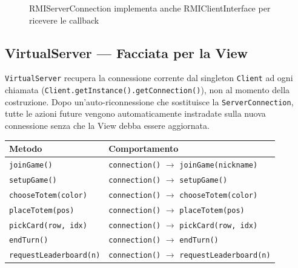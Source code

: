 \documentclass[a4paper,12pt]{article}
\newcommand{\code}[1]{\texttt{#1}}
\begin{document}
\begin{figure}[H]
\centering
{}
\caption{RMIServerConnection implementa anche RMIClientInterface per ricevere le callback}
\end{figure}

\subsection{VirtualServer --- Facciata per la View}

\code{VirtualServer} recupera la connessione corrente dal singleton \code{Client}
ad ogni chiamata (\code{Client.getInstance().getConnection()}), non al momento
della costruzione. Dopo un'auto-riconnessione che sostituisce la
\code{ServerConnection}, tutte le azioni future vengono automaticamente
instradate sulla nuova connessione senza che la View debba essere aggiornata.

\begin{small}
\begin{tabularx}{\textwidth}{@{}p{5cm}X@{}}
\toprule
\textbf{Metodo} & \textbf{Comportamento} \\
\midrule
\code{joinGame()}            & \code{connection()} $\to$ \code{joinGame(nickname)} \\
\code{setupGame()}           & \code{connection()} $\to$ \code{setupGame()} \\
\code{chooseTotem(color)}    & \code{connection()} $\to$ \code{chooseTotem(color)} \\
\code{placeTotem(pos)}       & \code{connection()} $\to$ \code{placeTotem(pos)} \\
\code{pickCard(row, idx)}    & \code{connection()} $\to$ \code{pickCard(row, idx)} \\
\code{endTurn()}             & \code{connection()} $\to$ \code{endTurn()} \\
\code{requestLeaderboard(n)} & \code{connection()} $\to$ \code{requestLeaderboard(n)} \\
\bottomrule
\end{tabularx}
\end{small}
\end{document}
